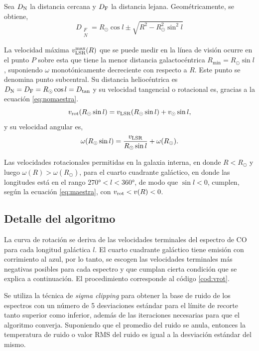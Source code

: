 Sea $D_\textnormal{N}$ la distancia cercana y $D_\textnormal{F}$ la distancia lejana. Geométricamente, se obtiene,
\begin{equation}
D_{\substack{F\\N}}=R_\odot\cos l\pm\sqrt{R^2-R_\odot^2\sin^2l}
\end{equation}

La velocidad máxima $v_\textnormal{LSR}^{\max}(R)$ que se puede medir en la línea de visión ocurre en el punto $P$ sobre esta que tiene la menor distancia galactocéntrica $R_{\min}=R_\odot\sin l$, suponiendo $\omega$ monotónicamente decreciente con respecto a $R$. Este punto se denomina punto subcentral. Su distancia heliocéntrica es $D_\textnormal{N}=D_\textnormal{F}=R_\odot\cos l=D_{\tan}$ y su velocidad tangencial o rotacional es, gracias a la ecuación \ref{eq:nomaestra}.
\begin{equation}
v_\textnormal{rot}(R_\odot\sin l)=v_\textnormal{LSR}(R_\odot\sin l)+v_\odot\sin l
,\label{eq:vrot}\end{equation}
y su velocidad angular es,
\begin{equation}
\omega(R_\odot\sin l)=\frac{v_\textnormal{LSR}}{R_\odot\sin l}+\omega(R_\odot)
.\label{eq:wrot}\end{equation}

Las velocidades rotacionales permitidas en la galaxia interna, en donde $R<R_\odot$ y luego $\omega(R)>\omega(R_\odot)$, para el cuarto cuadrante galáctico, en donde las longitudes está en el rango $\ang{270}<l<\ang{360}$, de modo que $\sin l<0$, cumplen, según la ecuación \ref{eq:maestra}, con $v_{\textnormal{rot}}<v(R)<0$.

\subsection{Detalle del algoritmo}

La curva de rotación se deriva de las velocidades terminales del espectro de CO para cada longitud galáctica $l$. El cuarto cuadrante galáctico tiene emisión con corrimiento al azul, por lo tanto, se escogen las velocidades terminales más negativas posibles para cada espectro y que cumplan cierta condición que se explica a continuación. El procedimiento corresponde al código \ref{cod:vrot}.

Se utiliza la técnica de \textit{sigma clipping} para obtener la base de ruido de los espectros con un número de 5 desviaciones estándar para el límite de recorte tanto superior como inferior, además de las iteraciones necesarias para que el algoritmo converja. Suponiendo que el promedio del ruido se anula, entonces la temperatura de ruido o valor RMS del ruido es igual a la desviación estándar del mismo.

